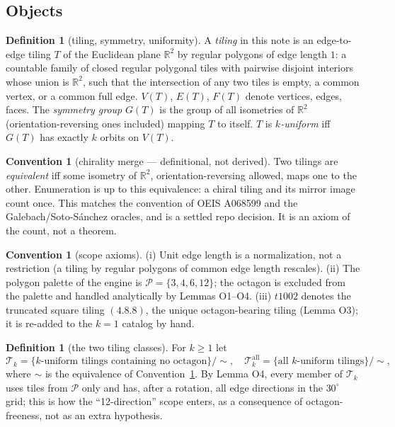 \documentclass[11pt]{article}
\theoremstyle{definition}
\newtheorem{definition}[theorem]{Definition}
\newtheorem{convention}[theorem]{Convention}
\newcommand{\T}{\mathcal{T}}
\newcommand{\R}{\mathbb{R}}
\begin{document}
\subsection{Objects}

\begin{definition}[tiling, symmetry, uniformity]\label{def:tiling}
A \emph{tiling} in this note is an edge-to-edge tiling $T$ of the Euclidean plane $\R^2$
by regular polygons of edge length $1$: a countable family of closed regular polygonal
tiles with pairwise disjoint interiors whose union is $\R^2$, such that the intersection
of any two tiles is empty, a common vertex, or a common full edge. $V(T)$, $E(T)$, $F(T)$
denote vertices, edges, faces. The \emph{symmetry group} $G(T)$ is the group of all
isometries of $\R^2$ (orientation-reversing ones included) mapping $T$ to itself. $T$ is
\emph{$k$-uniform} iff $G(T)$ has exactly $k$ orbits on $V(T)$.
\end{definition}

\begin{convention}[chirality merge --- definitional, not derived]\label{conv:chiral}
Two tilings are \emph{equivalent} iff some isometry of $\R^2$, orientation-reversing
allowed, maps one to the other. Enumeration is up to this equivalence: a chiral tiling and
its mirror image count once. This matches the convention of OEIS A068599 and the
Galebach/Soto-S\'anchez oracles, and is a settled repo decision. It is an axiom of the
count, not a theorem.
\end{convention}

\begin{convention}[scope axioms]\label{conv:scope}
(i) Unit edge length is a normalization, not a restriction (a tiling by regular polygons of
common edge length rescales). (ii) The polygon palette of the engine is
$\mathcal{P}=\{3,4,6,12\}$; the octagon is excluded from the palette and handled
analytically by Lemmas O1--O4. (iii) $t1002$ denotes the truncated square tiling
$(4.8.8)$, the unique octagon-bearing tiling (Lemma O3); it is re-added to the $k=1$
catalog by hand.
\end{convention}

\begin{definition}[the two tiling classes]\label{def:classes}
For $k\ge 1$ let
\[
\T_k = \{\text{$k$-uniform tilings containing no octagon}\}/\!\sim, \quad
\T_k^{\mathrm{all}} = \{\text{all $k$-uniform tilings}\}/\!\sim,
\]
where $\sim$ is the equivalence of Convention~\ref{conv:chiral}. By Lemma O4, every member
of $\T_k$ uses tiles from $\mathcal{P}$ only and has, after a rotation, all edge
directions in the $30^\circ$ grid; this is how the ``12-direction'' scope enters, as a
consequence of octagon-freeness, not as an extra hypothesis.
\end{definition}
\end{document}
